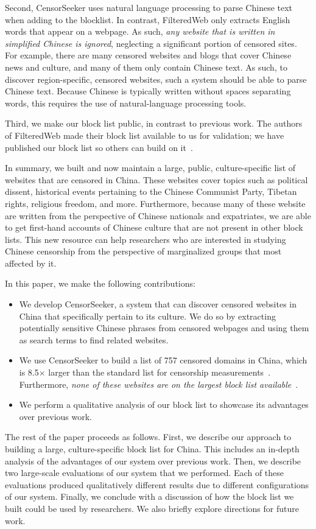 Second, CensorSeeker uses natural language processing to parse Chinese text
when adding to the blocklist. In contrast, FilteredWeb only extracts English
words that appear on a webpage. As such, \textit{any website that is written
in simplified Chinese is ignored}, neglecting a significant portion of
censored sites. For example, there are many censored websites and blogs that
cover Chinese news and culture, and many of them only contain Chinese text. As
such, to discover region-specific, censored websites, such a system should be
able to parse Chinese text. Because Chinese is typically written without
spaces separating words, this requires the use of natural-language processing
tools.

Third, we make our block list public, in contrast to previous work. The
authors of FilteredWeb made their block list available to us for validation;
we have published our block list so others can build on
it~\cite{censorsearch-lists}.

In summary, we built and now maintain a large, public, culture-specific list
of websites that are censored in China. These websites cover topics such as
political dissent, historical events pertaining to the Chinese Communist
Party, Tibetan rights, religious freedom, and more. Furthermore, because many
of these website are written from the perspective of Chinese nationals and expatriates,
we are able to get first-hand accounts of Chinese culture that are
not present in other block lists. This new resource can help researchers who
are interested in studying Chinese censorship from the perspective of
marginalized groups that most affected by it.

In this paper, we make the following contributions:
\begin{itemize}
  \item We develop CensorSeeker, a system that
can discover censored websites in China that specifically pertain to
its culture. We do so by extracting potentially sensitive Chinese
phrases from censored webpages and using them as search terms to find
related websites.
  \item We use CensorSeeker to build a list of 757 censored domains
in China, which is 8.5$\times$ larger than the standard list for censorship
measurements~\cite{citizenlab:block}. Furthermore, \textit{none of
these websites are on the largest block list
available}~\cite{darer2017filteredweb}.
  \item We perform a qualitative analysis of our block list to
    showcase its advantages over previous work.
\end{itemize}

The rest of the paper proceeds as follows. First, we describe our
approach to building a large, culture-specific block list for
China. This includes an in-depth analysis of the advantages of our
system over previous work. Then, we describe two large-scale
evaluations of our system that we performed. Each of these evaluations
produced qualitatively different results due to different
configurations of our system. Finally, we conclude
with a discussion of how the block list we built could be used by
researchers. We also briefly explore directions for future work.
